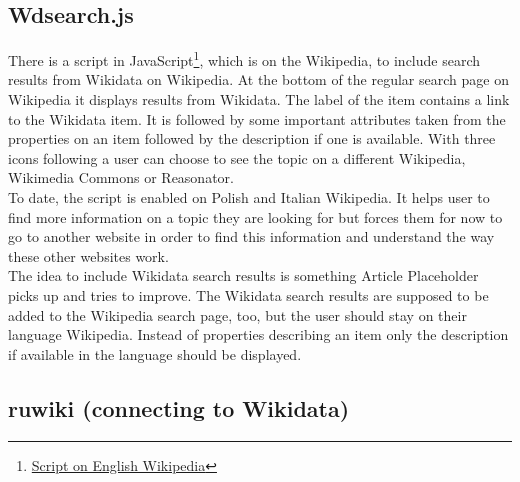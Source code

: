\subsection{Wdsearch.js}
There is a script in JavaScript\footnote{\href{https://en.wikipedia.org/w/index.php?title=MediaWiki:Wdsearch.js&action=raw&ctype=text/javascript}{Script on English Wikipedia}}, which is on the Wikipedia, to include search results from Wikidata on Wikipedia. At the bottom of the regular search page on Wikipedia it displays results from Wikidata. The label of the item contains a link to the Wikidata item. It is followed by some important attributes taken from the properties on an item followed by the description if one is available. With three icons following a user can choose to see the topic on a different Wikipedia, Wikimedia Commons or Reasonator. \\
To date, the script is enabled on Polish and Italian Wikipedia. It helps user to find more information on a topic they are looking for but forces them for now to go to another website in order to find this information and understand the way these other websites work. \\
The idea to include Wikidata search results is something Article Placeholder picks up and tries to improve. The Wikidata search results are supposed to be added to the Wikipedia search page, too, but the user should stay on their language Wikipedia. Instead of properties describing an item only the description if available in the language should be displayed. 

\subsection{ruwiki (connecting to Wikidata)}